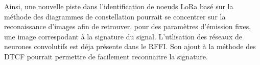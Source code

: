 \vspace{0.1cm}

Ainsi, une nouvelle piste dans l'identification de noeuds LoRa basé sur la méthode des diagrammes de constellation pourrait se concentrer sur la reconaissance d'images afin de retrouver, pour des paramètres d'émission fixes, une image correspodant à la signature du signal. L'utlisation des réseaux de neurones convolutifs est déja présente dans le RFFI. Son ajout à la méthode des DTCF pourrait permettre de facilement reconnaitre la signature.